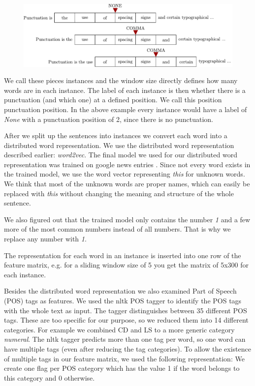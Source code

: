 \begin{figure}[ht]
    \centering
    \includegraphics[width=\textwidth]{img/sliding_window.pdf}
    \caption{}
    \label{fig:sliding_window}
\end{figure}

We call these pieces instances and the window size directly defines how many words are in each instance.
The label of each instance is then whether there is a punctuation (and which one) at a defined position.
We call this position punctuation position.
In the above example every instance would have a label of \emph{None} with a punctuation position of 2, since there is no punctuation.

After we split up the sentences into instances we convert each word into a distributed word representation.
We use the distributed word representation described earlier: \emph{word2vec}. 
The final model we used for our distributed word representation was trained on google news entries .
Since not every word exists in the trained model, we use the word vector representing \emph{this} for unknown words.
We think that most of the unknown words are proper names, which can easily be replaced with \emph{this} without changing the meaning and structure of the whole sentence.

We also figured out that the trained model only contains the number \emph{1} and a few more of the most common numbers instead of all numbers. 
That is why we replace any number with \emph{1}.

The representation for each word in an instance is inserted into one row of the feature matrix, e.g. for a sliding window size of 5 you get the matrix of 5x300 for each instance.

Besides the distributed word representation we also examined Part of Speech (POS) tags as features.
We used the nltk POS tagger to identify the POS tags with the whole text as input.
The tagger distinguishes between 35 different POS tags.
These are too specific for our purpose, so we reduced them into 14 different categories.
For example we combined CD and LS to a more generic category \emph{numeral}.
The nltk tagger predicts more than one tag per word, so one word can have multiple tags (even after reducing the tag categories).
To allow the existence of multiple tags in our feature matrix, we used the following representation:
We create one flag per POS category which has the value 1 if the word belongs to this category and 0 otherwise.


